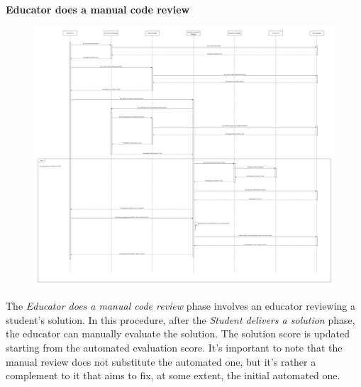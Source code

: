 \documentclass[../DD.tex]{subfiles}
\begin{document}
    \textbf{Educator does a manual code review}
    \begin{figure}[H]
        \centering
        \hspace*{-3cm}
        \includegraphics[width=1.4\textwidth]{../assets/section_2/EducatorDoesAManualCodeReview.png}
    \end{figure}
    \newpage
    The \textit{Educator does a manual code review} phase involves an educator reviewing a student's solution.
    In this procedure, after the \textit{Student delivers a solution} phase, the educator can manually evaluate the solution.
    The solution score is updated starting from the automated evaluation score.
    It's important to note that the manual review does not substitute the automated one, but it's rather a complement to it that aims to fix, at some extent, the initial automated one.
    \newpage
\end{document}
